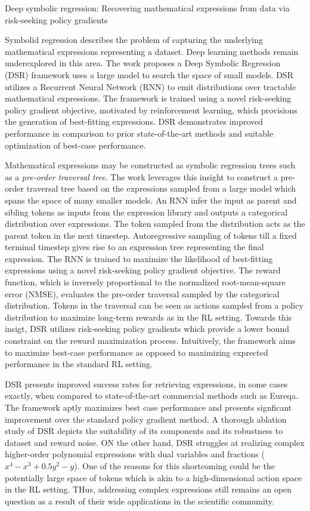 \documentclass[11pt,letterpaper]{article}
\begin{document}
\begin{center}
  \large{Deep symbolic regression: Recovering mathematical expressions from data via risk-seeking policy gradients}
\end{center}

Symbolid regression describes the problem of capturing the underlying mathematical expressions representing a dataset. Deep learning methods remain underexplored in this area. The work proposes a Deep Symbolic Regression (DSR) framework uses a large model to search the space of small models. DSR utilizes a Recurrent Neural Network (RNN) to emit distributions over tractable mathematical expressions. The framework is trained using a novel risk-seeking policy gradient objective, motivated by reinforcement learning, which provisions the generation of best-fitting expressions. DSR demonstrates improved performance in comparison to prior state-of-the-art methods and suitable optimization of best-case performance. 

Mathematical expressions may be constructed as symbolic regression trees such as a \textit{pre-order traversal tree}. The work leverages this insight to construct a pre-order traversal tree based on the expressions sampled from a large model which spans the space of many smaller models. An RNN infer the input as parent and sibling tokens as inputs from the expression library and outputs a categorical distribution over expressions. The token sampled from the distribution acts as the parent token in the next timestep. Autoregressive sampling of tokens till a fixed terminal timestep gives rise to an expression tree representing the final expression. The RNN is trained to maximize the likelihood of best-fitting expressions using a novel risk-seeking policy gradient objective. The reward function, which is inversely proportional to the normalized root-mean-square error (NMSE), evaluates the pre-order traversal sampled by the categorical distribution. Tokens in the traversal can be seen as actions sampled from a policy distribution to maximize long-term rewards as in the RL setting. Towards this insigt, DSR utilizes risk-seeking policy gradients which provide a lower bound constraint on the reward maximization process. Intuitively, the framework aims to maximize best-case performance as opposed to maximizing exprected performance in the standard RL setting.

DSR presents improved success rates for retrieving expressions, in some cases exactly, when compared to state-of-the-art commercial methods such as Eureqa. The framework aptly maximizes best case performance and presents signficant improvement over the standard policy gradient method. A thorough ablation study of DSR depicts the suitability of its components and its robustness to dataset and reward noise. ON the other hand, DSR struggles at realizing complex higher-order polynomial expressions with dual variables and fractions ($x^{4} - x^{3} + 0.5y^{2} - y$). One of the reasons for this shortcoming could be the potentially large space of tokens which is akin to a high-dimensional action space in the RL setting. THus, addressing complex expressions still remains an open question as a result of their wide applications in the scientific community. 
\end{document}
